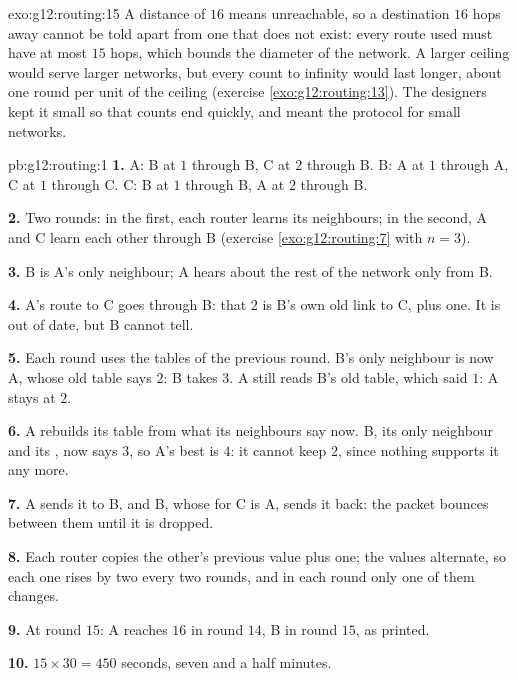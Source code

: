 \begin{solution}{exo:g12:routing:15}
A distance of $16$ means unreachable, so a destination $16$ hops away cannot be told apart from one that does not
exist: every route used must have at most $15$ hops, which bounds the diameter of the network. A larger ceiling would
serve larger networks, but every count to infinity would last longer, about one round per unit of the ceiling
(exercise \ref{exo:g12:routing:13}). The designers kept it small so that counts end quickly, and meant the protocol
for small networks.
\end{solution}

\begin{solution}{pb:g12:routing:1}
\textbf{1.} A: B at $1$ through B, C at $2$ through B. B: A at $1$ through A, C at $1$ through C. C: B at $1$
through B, A at $2$ through B.

\textbf{2.} Two rounds: in the first, each router learns its neighbours; in the second, A and C learn each other
through B (exercise \ref{exo:g12:routing:7} with $n = 3$).

\textbf{3.} B is A's only neighbour; A hears about the rest of the network only from B.

\textbf{4.} A's route to C goes through B: that $2$ is B's own old link to C, plus one. It is out of date, but B
cannot tell.

\textbf{5.} Each round uses the tables of the previous round. B's only neighbour is now A, whose old table says
$2$: B takes $3$. A still reads B's old table, which said $1$: A stays at $2$.

\textbf{6.} A rebuilds its table from what its neighbours say now. B, its only neighbour and its , now says
$3$, so A's best is $4$: it cannot keep $2$, since nothing supports it any more.

\textbf{7.} A sends it to B, and B, whose  for C is A, sends it back: the packet bounces between them until
it is dropped.

\textbf{8.} Each router copies the other's previous value plus one; the values alternate, so each one rises by two
every two rounds, and in each round only one of them changes.

\textbf{9.} At round $15$: A reaches $16$ in round $14$, B in round $15$, as printed.

\textbf{10.} $15 \times 30 = 450$ seconds, seven and a half minutes.


\end{solution}
